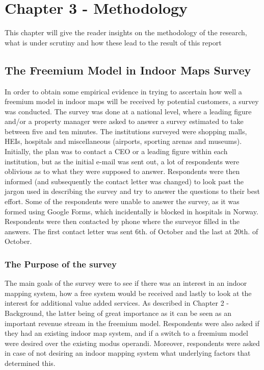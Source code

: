 \chapter{Chapter 3 - Methodology}
This chapter will give the reader insights on the methodology of the research, what is under scrutiny and how these lead to the result of this report
\section{The Freemium Model in Indoor Maps Survey}
In order to obtain some empirical evidence in trying to ascertain how well a freemium model in indoor maps will be received by potential customers, a survey was conducted. The survey was done at a national level, where a leading figure and/or a property manager were asked to answer a survey estimated to take between five and ten minutes. 
The institutions surveyed were shopping malls, HEIs, hospitals and miscellaneous (airports, sporting arenas and museums).%
\newline
\\
Initially, the plan was to contact a CEO or a leading figure within each institution, but as the initial e-mail was sent out, a lot of respondents were oblivious as to what they were supposed to answer. Respondents were then informed (and subsequently the contact letter was changed) to look past the jargon used in describing the survey and try to answer the questions to their best effort. Some of the respondents were unable to answer the survey, as it was formed using Google Forms, which incidentally is blocked in hospitals in Norway. Respondents were then contacted by phone where the surveyor filled in the answers. The first contact letter was sent 6th. of October and the last at 20th. of October. 
\subsection{The Purpose of the survey}
The main goals of the survey were to see if there was an interest in an indoor mapping system, how a free system would be received and lastly to look at the interest for additional value added services. As described in Chapter 2 - Background, the latter being of great importance as it can be seen as an important revenue stream in the freemium model. Respondents were also asked if they had an existing indoor map system, and if a switch to a freemium model were desired over the existing modus operandi. Moreover, respondents were asked in case of not desiring an indoor mapping system what underlying factors that determined this.
